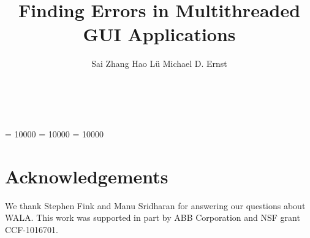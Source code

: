 \documentclass{sig-alternate-issta}
\begin{document}
\clubpenalty = 10000
\widowpenalty = 10000
\displaywidowpenalty = 10000


\title{Finding Errors in Multithreaded GUI Applications}

\author{
\alignauthor Sai Zhang \quad Hao L\"u \quad Michael D. Ernst\\
       \\
       \\
}


\maketitle
\thispagestyle{empty}
\pagestyle{empty}

















\section{Acknowledgements}
We thank Stephen Fink and Manu Sridharan for
answering our questions about WALA\@. This work was supported in part by ABB Corporation and NSF grant CCF-1016701.
\vspace{-2mm}

\balance



\end{document}
